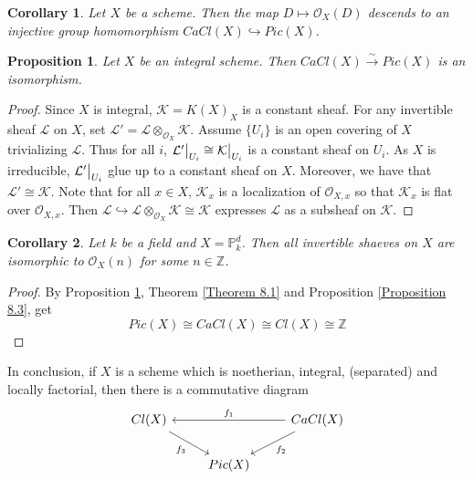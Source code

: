 \documentclass{ctexart}
\newtheorem{proposition}{Proposition}[section]
\newtheorem{corollary}{Corollary}[section]
\begin{document}
\begin{corollary}
    Let $X$ be a scheme.
    Then the map $D \longmapsto \mathcal{O}_{X}(D)$ descends to an injective group homomorphism $CaCl(X) \hookrightarrow Pic(X)$.
    \label{Corollary 8.1}
\end{corollary}
\begin{proposition}
    Let $X$ be an integral scheme.
    Then $CaCl(X) \overset{\sim}{\longrightarrow} Pic(X)$ is an isomorphism.
    \label{Proposition 8.5}
\end{proposition}
\begin{proof}
    Since $X$ is integral, $\mathcal{K} = K(X)_{X}$ is a constant sheaf.
    For any invertible sheaf $\mathcal{L}$ on $X$, set $\mathcal{L}' = \mathcal{L} \otimes_{\mathcal{O}_{X}} \mathcal{K}$.
    Assume $\{U_{i}\}$ is an open covering of $X$ trivializing $\mathcal{L}$.
    Thus for all $i$, $\mathcal{L}'\big{|}_{U_{i}} \cong \mathcal{K}\big{|}_{U_{i}}$ is a constant sheaf on $U_{i}$.
    As $X$ is irreducible, $\mathcal{L}'\big{|}_{U_{i}}$ glue up to a constant sheaf on $X$.
    Moreover, we have that $\mathcal{L}' \cong \mathcal{K}$.
    Note that for all $x\in X$, $\mathcal{K}_{x}$ is a localization of $\mathcal{O}_{X, x}$ so that $\mathcal{K}_{x}$ is flat over $\mathcal{O}_{X, x}$.
    Then $\mathcal{L} \hookrightarrow \mathcal{L} \otimes_{\mathcal{O}_{X}} \mathcal{K} \cong \mathcal{K}$ expresses $\mathcal{L}$ as a subsheaf on $\mathcal{K}$.
\end{proof}
\begin{corollary}
    Let $k$ be a field and $X = \mathbb{P}_{k}^{d}$.
    Then all invertible shaeves on $X$ are isomorphic to $\mathcal{O}_{X}(n)$ for some $n\in \mathbb{Z}$.
    \label{Corollary 8.2}
\end{corollary}
\begin{proof}
    By Proposition \ref{Proposition 8.5}, Theorem \ref{Theorem 8.1} and Proposition \ref{Proposition 8.3}, get
    \begin{equation*}
        Pic(X) \cong CaCl(X) \cong Cl(X) \cong \mathbb{Z}
    \end{equation*}
\end{proof}
In conclusion, if $X$ is a scheme which is noetherian, integral, (separated) and locally factorial,
then there is a commutative diagram
\begin{equation*}
    \begin{tikzcd}
        Cl(X) \arrow[dr, "f_{3}" swap] &&
        CaCl(X) \arrow[ll, "f_{1}" swap] \arrow[dl, "f_{2}"] \\
        & Pic(X) &
    \end{tikzcd}
\end{equation*}
\end{document}

